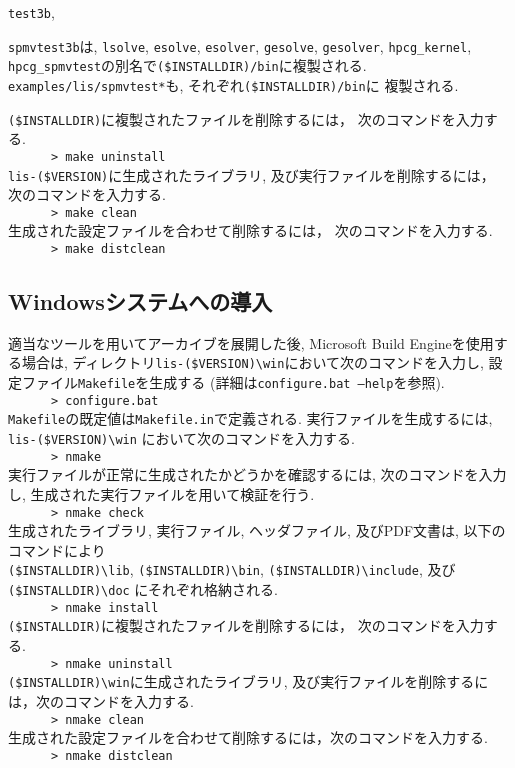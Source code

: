 \documentclass[a4paper]{jarticle}
\begin{document}
{{\tt test3b}, {{\tt spmvtest3b}は, 
{\tt lsolve}, {\tt esolve}, {\tt esolver}, {\tt gesolve}, {\tt gesolver}, 
{\tt hpcg\_kernel}, {\tt hpcg\_spmvtest}の別名で{\tt (\$INSTALLDIR)/bin}に複製される.
{\tt examples/lis/spmvtest*}も, それぞれ{\tt (\$INSTALLDIR)/bin}に
複製される.

{\tt (\$INSTALLDIR)}に複製されたファイルを削除するには，
次のコマンドを入力する. \\
 \verb+      > make uninstall+\\
{\tt lis-(\$VERSION)}に生成されたライブラリ, 及び実行ファイルを削除するには，
次のコマンドを入力する. \\
 \verb+      > make clean+\\
生成された設定ファイルを合わせて削除するには，
次のコマンドを入力する. \\
 \verb+      > make distclean+

\subsection{Windowsシステムへの導入}
適当なツールを用いてアーカイブを展開した後, 
Microsoft Build Engineを使用する場合は, 
ディレクトリ{\tt lis-(\$VERSION)\textbackslash win}において次のコマンドを入力し, 
設定ファイル{\tt Makefile}を生成する 
(詳細は{\tt configure.bat --help}を参照). \\
 \verb+      > configure.bat+\\
{\tt Makefile}の既定値は{\tt Makefile.in}で定義される. 
実行ファイルを生成するには, {\tt lis-(\$VERSION)\textbackslash win}
において次のコマンドを入力する. \\
 \verb+      > nmake+\\
実行ファイルが正常に生成されたかどうかを確認するには, 
次のコマンドを入力し, 生成された実行ファイルを用いて検証を行う. \\
 \verb+      > nmake check+\\
生成されたライブラリ, 実行ファイル, ヘッダファイル, 及びPDF文書は,
以下のコマンドにより\\
{\tt (\$INSTALLDIR)\textbackslash lib}, 
{\tt (\$INSTALLDIR)\textbackslash bin},
{\tt (\$INSTALLDIR)\textbackslash include}, 
及び{\tt (\$INSTALLDIR)\textbackslash doc}
にそれぞれ格納される. \\
 \verb+      > nmake install+\\
{\tt (\$INSTALLDIR)}に複製されたファイルを削除するには，
次のコマンドを入力する. \\
 \verb+      > nmake uninstall+\\
{\tt (\$INSTALLDIR)\textbackslash win}に生成されたライブラリ,
及び実行ファイルを削除するには，次のコマンドを入力する. \\
 \verb+      > nmake clean+\\
生成された設定ファイルを合わせて削除するには，次のコマンドを入力する. \\
 \verb+      > nmake distclean+

}}
\end{document}
